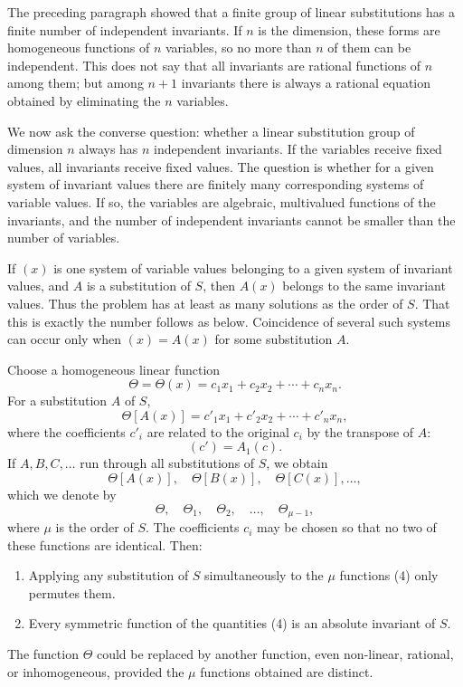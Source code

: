 \documentclass[11pt]{article}
\begin{document}
The preceding paragraph showed that a finite group of linear substitutions has a finite number of independent invariants. If $n$ is the dimension, these forms are homogeneous functions of $n$ variables, so no more than $n$ of them can be independent. This does not say that all invariants are rational functions of $n$ among them; but among $n+1$ invariants there is always a rational equation obtained by eliminating the $n$ variables.

We now ask the converse question: whether a linear substitution group of dimension $n$ always has $n$ independent invariants. If the variables receive fixed values, all invariants receive fixed values. The question is whether for a given system of invariant values there are finitely many corresponding systems of variable values. If so, the variables are algebraic, multivalued functions of the invariants, and the number of independent invariants cannot be smaller than the number of variables.

If $(x)$ is one system of variable values belonging to a given system of invariant values, and $A$ is a substitution of $S$, then $A(x)$ belongs to the same invariant values. Thus the problem has at least as many solutions as the order of $S$. That this is exactly the number follows as below. Coincidence of several such systems can occur only when $(x)=A(x)$ for some substitution $A$.

Choose a homogeneous linear function
\begin{equation}
\Theta=\Theta(x)=c_1x_1+c_2x_2+\cdots+c_nx_n.
\tag{1}
\end{equation}
For a substitution $A$ of $S$,
\begin{equation}
\Theta[A(x)]=c'_1x_1+c'_2x_2+\cdots+c'_nx_n,
\tag{2}
\end{equation}
where the coefficients $c'_i$ are related to the original $c_i$ by the transpose of $A$:
\[
(c')=A_1(c).
\]
If $A,B,C,\ldots$ run through all substitutions of $S$, we obtain
\begin{equation}
\Theta[A(x)],\quad\Theta[B(x)],\quad\Theta[C(x)],\ldots,
\tag{3}
\end{equation}
which we denote by
\begin{equation}
\Theta,\quad\Theta_1,\quad\Theta_2,\quad\ldots,\quad\Theta_{\mu-1},
\tag{4}
\end{equation}
where $\mu$ is the order of $S$. The coefficients $c_i$ may be chosen so that no two of these functions are identical. Then:
\begin{enumerate}[label=\arabic*.,leftmargin=2.2em]
\item Applying any substitution of $S$ simultaneously to the $\mu$ functions (4) only permutes them.
\item Every symmetric function of the quantities (4) is an absolute invariant of $S$.
\end{enumerate}
The function $\Theta$ could be replaced by another function, even non-linear, rational, or inhomogeneous, provided the $\mu$ functions obtained are distinct.
\end{document}
